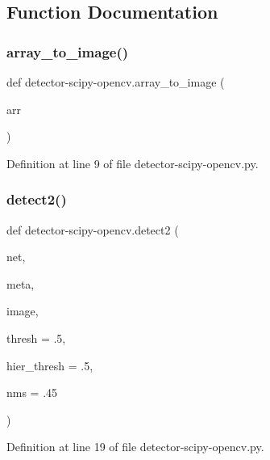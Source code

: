 \subsection{Function Documentation}
\mbox{\label{namespacedetector-scipy-opencv_a21af42bac0599affdd209fb7ad6ace05}} 
\subsubsection{\texorpdfstring{array\_to\_image()}{array\_to\_image()}}
{\footnotesize\ttfamily def detector-\/scipy-\/opencv.\+array\+\_\+to\+\_\+image (\begin{DoxyParamCaption}\item[{}]{arr }\end{DoxyParamCaption})}



Definition at line 9 of file detector-\/scipy-\/opencv.\+py.

\mbox{\label{namespacedetector-scipy-opencv_a965d0b9c768aaaf2cede0dd9e1148b1d}} 
\subsubsection{\texorpdfstring{detect2()}{detect2()}}
{\footnotesize\ttfamily def detector-\/scipy-\/opencv.\+detect2 (\begin{DoxyParamCaption}\item[{}]{net,  }\item[{}]{meta,  }\item[{}]{image,  }\item[{}]{thresh = {\ttfamily .5},  }\item[{}]{hier\+\_\+thresh = {\ttfamily .5},  }\item[{}]{nms = {\ttfamily .45} }\end{DoxyParamCaption})}



Definition at line 19 of file detector-\/scipy-\/opencv.\+py.



